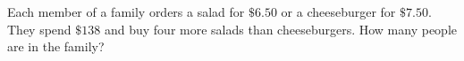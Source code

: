 Each member of a family orders a salad for $\$6.50$ or a cheeseburger for $\$7.50$. They spend $\$138$ and buy four more salads than cheeseburgers. How many people are in the family?
